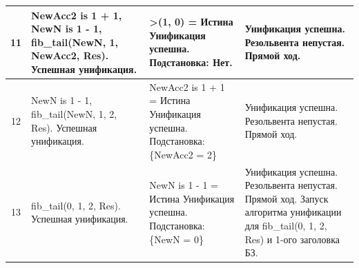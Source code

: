 \begin{tabularx}{\textwidth}{|c|>{\small}X|>{\small}X|>{\small}X|}
	11                                                                                 &
	NewAcc2 is 1 + 1, \newline
	NewN is 1 - 1, \newline
	fib\_tail(NewN, 1, NewAcc2, Res). \newline
	Успешная унификация.                                                               &
	>(1, 0) = \newline
	Истина \newline
	Унификация успешна. \newline
	Подстановка: \newline
	Нет.                                                                               &
	Унификация успешна. \newline
	Резольвента непустая. \newline
	Прямой ход.                                                                          \\
	\hline

	12                                                                                 &
	NewN is 1 - 1, \newline
	fib\_tail(NewN, 1, 2, Res). \newline
	Успешная унификация.                                                               &
	NewAcc2 is 1 + 1 = \newline
	Истина \newline
	Унификация успешна. \newline
	Подстановка: \newline
	\{NewAcc2 = 2\}                                                                    &
	Унификация успешна. \newline
	Резольвента непустая. \newline
	Прямой ход.                                                                          \\
	\hline

	13                                                                                 &
	fib\_tail(0, 1, 2, Res). \newline
	Успешная унификация.                                                               &
	NewN is 1 - 1 = \newline
	Истина \newline
	Унификация успешна. \newline
	Подстановка: \newline
	\{NewN = 0\}                                                                       &
	Унификация успешна. \newline
	Резольвента непустая. \newline
	Прямой ход. \newline
	Запуск алгоритма унификации для fib\_tail(0, 1, 2, Res) и 1-ого заголовка БЗ.        \\
	\hline


\end{tabularx}
